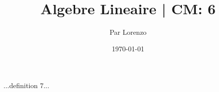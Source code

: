 \documentclass[a4paper, 12pt]{article}
\title{Algebre Lineaire | CM: 6}
\author{Par Lorenzo}
\date{\today}
\begin{document}
\maketitle

\begin{definition}
    ...definition 7...
\end{definition}
\end{document}
